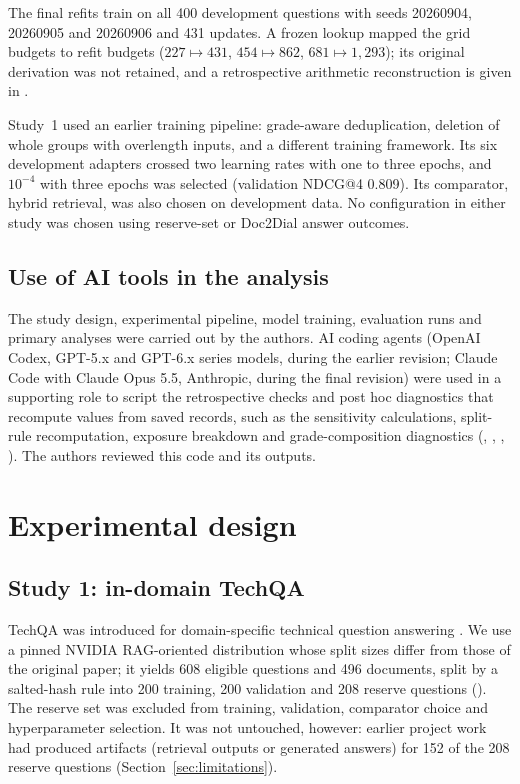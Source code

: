 The final refits train on all 400 development questions with seeds 20260904, 20260905 and 20260906 and 431 updates. A frozen lookup mapped the grid budgets to refit budgets ($227\mapsto431$, $454\mapsto862$, $681\mapsto1{,}293$); its original derivation was not retained, and a retrospective arithmetic reconstruction is given in .

Study~1 used an earlier training pipeline: grade-aware deduplication, deletion of whole groups with overlength inputs, and a different training framework. Its six development adapters crossed two learning rates with one to three epochs, and $10^{-4}$ with three epochs was selected (validation NDCG@4 0.809). Its comparator, hybrid retrieval, was also chosen on development data. No configuration in either study was chosen using reserve-set or Doc2Dial answer outcomes.

\subsection{Use of AI tools in the analysis}
The study design, experimental pipeline, model training, evaluation runs and primary analyses were carried out by the authors. AI coding agents (OpenAI Codex, GPT-5.x and GPT-6.x series models, during the earlier revision; Claude Code with Claude Opus 5.5, Anthropic, during the final revision) were used in a supporting role to script the retrospective checks and post hoc diagnostics that recompute values from saved records, such as the sensitivity calculations, split-rule recomputation, exposure breakdown and grade-composition diagnostics (, , , ). The authors reviewed this code and its outputs.

\section{Experimental design}
\subsection{Study 1: in-domain TechQA}
TechQA was introduced for domain-specific technical question answering \citep{castelli2020}. We use a pinned NVIDIA RAG-oriented distribution whose split sizes differ from those of the original paper; it yields 608 eligible questions and 496 documents, split by a salted-hash rule into 200 training, 200 validation and 208 reserve questions (). The reserve set was excluded from training, validation, comparator choice and hyperparameter selection. It was not untouched, however: earlier project work had produced artifacts (retrieval outputs or generated answers) for 152 of the 208 reserve questions (Section~\ref{sec:limitations}).

